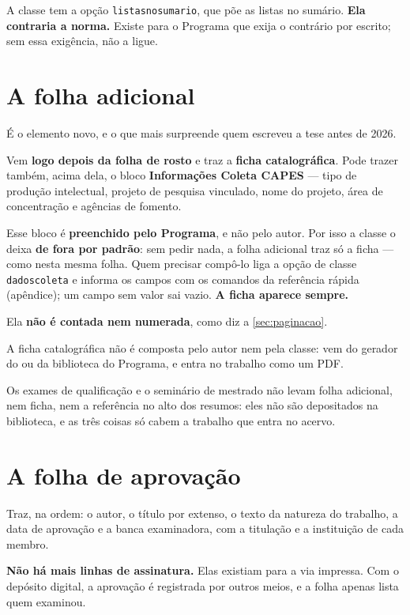 \documentclass[dsc]{ufrj}
\begin{document}
  A classe tem a opção \texttt{listasnosumario}, que põe as listas no sumário.
  \textbf{Ela contraria a norma.} Existe para o Programa que exija o
  contrário por escrito; sem essa exigência, não a ligue.

  \section{A folha adicional}

  É o elemento novo, e o que mais surpreende quem escreveu a tese antes de 2026.

  Vem \textbf{logo depois da folha de rosto} e traz a \textbf{ficha
  catalográfica}. Pode trazer também, acima dela, o bloco \textbf{Informações
  Coleta CAPES} --- tipo de produção intelectual, projeto de pesquisa vinculado,
  nome do projeto, área de concentração e agências de fomento.

  Esse bloco é \textbf{preenchido pelo Programa}, e não pelo autor. Por isso a
  classe o deixa \textbf{de fora por padrão}: sem pedir nada, a folha adicional
  traz só a ficha --- como nesta mesma folha. Quem precisar compô-lo liga a
  opção de classe \verb|dadoscoleta| e informa os campos com os comandos da
  referência rápida (apêndice); um campo sem valor sai vazio. \textbf{A ficha
  aparece sempre.}

  Ela \textbf{não é contada nem numerada}, como diz a \autoref{sec:paginacao}.

  A ficha catalográfica não é composta pelo autor nem pela classe: vem do gerador
  do  ou da biblioteca do Programa, e entra no trabalho como um PDF.

  Os exames de qualificação e o seminário de mestrado não levam folha adicional,
  nem ficha, nem a referência no alto dos resumos: eles não são depositados na
  biblioteca, e as três coisas só cabem a trabalho que entra no acervo.

  \section{A folha de aprovação}

  Traz, na ordem: o autor, o título por extenso, o texto da natureza do trabalho,
  a data de aprovação e a banca examinadora, com a titulação e a instituição de
  cada membro.

  \textbf{Não há mais linhas de assinatura.} Elas existiam para a via impressa.
  Com o depósito digital, a aprovação é registrada por outros meios, e a folha
  apenas lista quem examinou.
\end{document}
